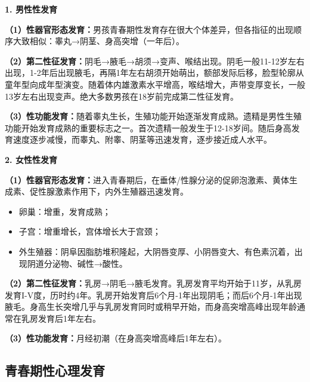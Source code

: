 \begin{keybox}
\textbf{1. 男性性发育}

\textbf{（1）性器官形态发育：}男孩青春期性发育存在很大个体差异，但各指征的出现顺序大致相似：睾丸→阴茎、身高突增（一年后）。

\textbf{（2）第二性征发育：}阴毛→腋毛→胡须→变声、喉结出现。阴毛一般11-12岁左右出现，1-2年后出现腋毛，再隔1年左右胡须开始萌出，额部发际后移，脸型轮廓从童年型向成年型演变。随着体内雄激素水平增高，喉结增大，声带变厚变长，一般13岁左右出现变声。绝大多数男孩在18岁前完成第二性征发育。

\vspace{3pt}
\begin{center}
\end{center}
\vspace{3pt}

\textbf{（3）性功能发育：}随着睾丸生长，生殖功能开始逐渐发育成熟。遗精是男性生殖功能开始发育成熟的重要标志之一。首次遗精一般发生于12-18岁间。随后身高发育速度逐步减慢，而睾丸、附睾、阴茎等迅速发育，逐步接近成人水平。

\textbf{2. 女性性发育}

\textbf{（1）性器官形态发育：}进入青春期后，在垂体/性腺分泌的促卵泡激素、黄体生成素、促性腺激素作用下，内外生殖器迅速发育。
\begin{itemize}[leftmargin=*]
    \item 卵巢：增重，发育成熟；
    \item 子宫：增重增长，宫体增长大于宫颈；
    \item 外生殖器：阴阜因脂肪堆积隆起，大阴唇变厚、小阴唇变大、有色素沉着，出现阴道分泌物、碱性→酸性。
\end{itemize}

\textbf{（2）第二性征发育：}乳房→阴毛→腋毛发育。乳房发育平均开始于11岁，从乳房发育I-V度，历时约4年。乳房开始发育后6个月-1年出现阴毛；而后6个月-1年出现腋毛。身高生长突增几乎与乳房发育同时或稍早开始，而身高突增高峰出现年龄通常在乳房发育后1年左右。

\textbf{（3）性功能发育：}月经初潮（在身高突增高峰后1年左右）。
\end{keybox}

\subsection{青春期性心理发育}

